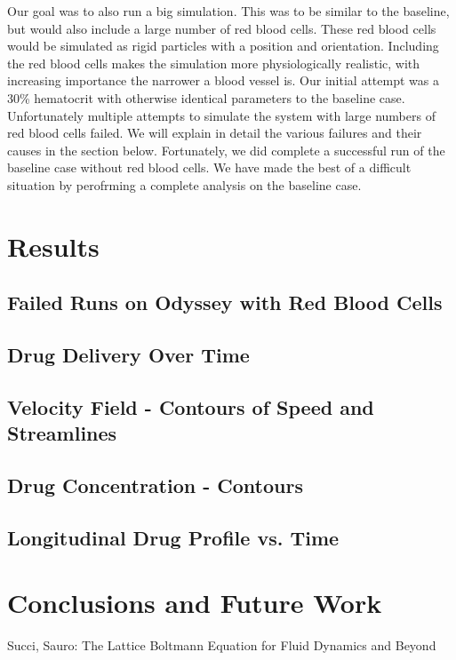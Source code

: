 \documentclass[11pt]{article} %
\begin{document}
Our goal was to also run a big simulation.  
This was to be similar to the baseline, but would also include a large number of red blood cells.
These red blood cells would be simulated as rigid particles with a position and orientation.
Including the red blood cells makes the simulation more physiologically realistic,
with increasing importance the narrower a blood vessel is.
Our initial attempt was a 30\% hematocrit with otherwise identical parameters to the baseline case.  
Unfortunately multiple attempts to simulate the system with large numbers of red blood cells failed.
We will explain in detail the various failures and their causes in the section below.
Fortunately, we did complete a successful run of the baseline case without red blood cells.
We have made the best of a difficult situation by perofrming a complete analysis on the baseline case.

\section{Results}

\subsection{Failed Runs on Odyssey with Red Blood Cells}

\subsection{Drug Delivery Over Time}

\subsection{Velocity Field - Contours of Speed and Streamlines}

\subsection{Drug Concentration - Contours}

\subsection{Longitudinal Drug Profile vs. Time}

\section{Conclusions and Future Work}


\begin{thebibliography}{9}
Succi, Sauro: The Lattice Boltmann Equation for Fluid Dynamics and Beyond

\end{thebibliography}
\end{document}
